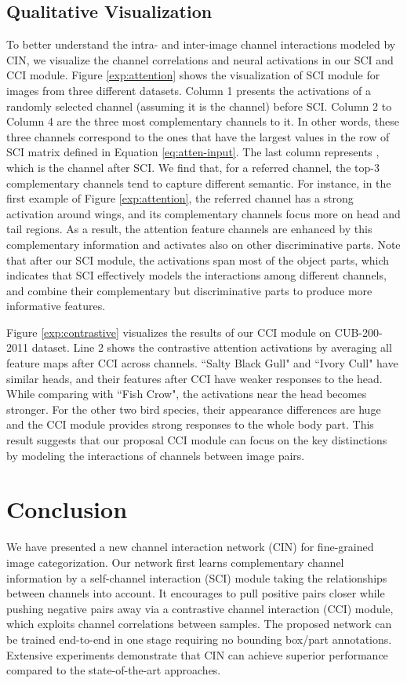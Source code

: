 \documentclass[letterpaper]{article} \usepackage{aaai20}  \usepackage{times}  \usepackage{helvet} \usepackage{courier}  \usepackage[hyphens]{url}  \usepackage{graphicx} \urlstyle{rm} \def\UrlFont{\rm}  \usepackage{graphicx}  \frenchspacing  \setlength{\pdfpagewidth}{8.5in}  \setlength{\pdfpageheight}{11in}  \usepackage{amsmath,amssymb}
\begin{document}
\subsection{Qualitative Visualization}
To better understand the intra- and inter-image channel interactions modeled by CIN, we visualize the channel correlations and neural activations in our SCI and CCI module. Figure \ref{exp:attention} shows the visualization of SCI module for images from three different datasets. Column 1 presents the activations of a randomly selected channel (assuming it is the  channel) before SCI. Column 2 to Column 4 are the three most complementary channels to it.
In other words, these three channels correspond to the ones that have the largest values in the  row of SCI matrix  defined in Equation \ref{eq:atten-input}. The last column represents , which is the  channel after SCI. We find that, for a referred channel, the top-3 complementary channels tend to capture different semantic.
For instance, in the first example of Figure \ref{exp:attention}, the referred channel has a strong activation around wings, and its complementary channels focus more on head and tail regions. As a result, the attention feature channels are enhanced by this complementary information and activates also on other discriminative parts.
Note that after our SCI module, the activations span most of the object parts, which indicates that SCI effectively models the interactions among different channels, and combine their complementary but discriminative parts to produce more informative features.

Figure \ref{exp:contrastive} visualizes the results of our CCI module on CUB-200-2011 dataset. Line 2 shows the contrastive attention activations by averaging all feature maps after CCI across channels. ``Salty Black Gull" and ``Ivory Cull" have similar heads, and their features after CCI have weaker responses to the head. While comparing with ``Fish Crow", the activations near the head becomes stronger. For the other two bird species, their appearance differences are huge and the CCI module
provides strong responses to the whole body part.
This result suggests that our proposal CCI module can focus on the key distinctions by modeling the interactions of channels between image pairs.


\section{Conclusion}
We have presented a new channel interaction network (CIN) for fine-grained image categorization. Our network first learns complementary channel information by a self-channel interaction (SCI) module taking the relationships between channels into account. It encourages to pull positive pairs closer while pushing negative pairs away via a contrastive channel interaction (CCI) module, which exploits channel correlations between samples. The proposed network can be trained end-to-end in one stage requiring no bounding box/part annotations. Extensive experiments demonstrate that CIN can achieve superior performance compared to the state-of-the-art approaches.

\begin{quote}
\begin{small}

\end{small}
\end{quote}
\end{document}
